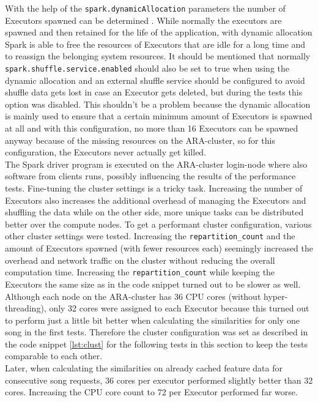 \noindent With the help of the \lstinline{spark.dynamicAllocation} parameters the number of Executors spawned can be determined \cite[p. 153]{sparkbook1}. While normally the executors are spawned and then retained for the life of the application, with dynamic allocation Spark is able to free the resources of Executors that are idle for a long time and to reassign the belonging system resources. 
It should be mentioned that normally \lstinline{spark.shuffle.service.enabled} should also be set to true when using the dynamic allocation and an external shuffle service should be configured to avoid shuffle data gets lost in case an Executor gets deleted, but during the tests this option was disabled. This shouldn't be a problem because the dynamic allocation is mainly used to ensure that a certain minimum amount of Executors is spawned at all and with this configuration, no more than 16 Executors can be spawned anyway because of the missing resources on the ARA-cluster, so for this configuration, the Executors never actually get killed.\\
\noindent The Spark driver program is executed on the ARA-cluster login-node where also software from clients runs, possibly influencing the results of the performance tests. Fine-tuning the cluster settings is a tricky task. Increasing the number of Executors also increases the additional overhead of managing the Executors and shuffling the data while on the other side, more unique tasks can be distributed better over the compute nodes. To get a performant cluster configuration, various other cluster settings were tested. Increasing the \lstinline{repartition_count} and the amount of Executors spawned (with fewer resources each) seemingly increased the overhead and network traffic on the cluster without reducing the overall computation time. Increasing the \lstinline{repartition_count} while keeping the Executors the same size as in the code snippet turned out to be slower as well.\\ 
Although each node on the ARA-cluster has 36 CPU cores (without hyper-threading), only 32 cores were assigned to each Executor because this turned out to perform just a little bit better when calculating the similarities for only one song in the first tests. Therefore the cluster configuration was set as described in the code snippet \ref{lst:clust} for the following tests in this section to keep the tests comparable to each other.\\
Later, when calculating the similarities on already cached feature data for consecutive song requests, 36 cores per executor performed slightly better than 32 cores. Increasing the CPU core count to 72 per Executor performed far worse.\\ 
